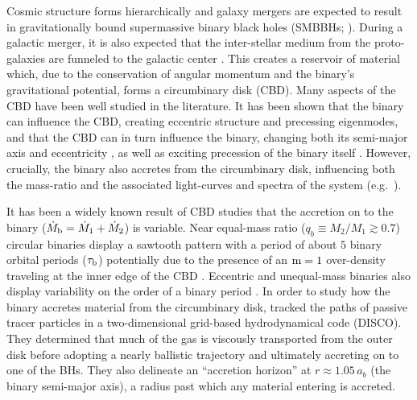 \documentclass[fleqn,usenatbib]{mnras}
\begin{document}
Cosmic structure forms hierarchically and galaxy mergers are expected to result in gravitationally bound supermassive binary black holes (SMBBHs; \citealt{white_rees_78, begelman_blandford_rees_80}). During a galactic merger, it is also expected that the inter-stellar medium from the proto-galaxies are funneled to the galactic center \citep{barnes_hernquist_92}. This creates a reservoir of material which, due to the conservation of angular momentum and the binary's gravitational potential, forms a circumbinary disk (CBD). Many aspects of the CBD have been well studied in the literature. It has been shown that the binary can influence the CBD, creating eccentric structure and precessing eigenmodes, \citep{lubow_91, whitehurst_94, nelson_2003, Goodchild_2006, MacFadyen_08, paardekooper_2008, kley_2008, shi_2012, miranda_munoz_lai_2017, Thun_2017, munoz_lithwick_2020, Lubow_2022, siwek_prefacc} and that the CBD can in turn influence the binary, changing both its semi-major axis and eccentricity \citep{roedig_2011, farris_2014, Moody_19, munoz_miranda_lai_19, Tiede_2020, zrake_2021, dorazio_2013, siwek_cbdorbevol, dorazio_duffel}, as well as exciting precession of the binary itself \citep{tiede_24_diskinducedprecession, dittmann_prec, calcino_prec}. However, crucially, the binary also accretes from the circumbinary disk, influencing both the mass-ratio and the associated light-curves and spectra of the system (e.g.\ \citealt{dorazio_2013, dorazio_charisi, siwek_prefacc, ryan_2022, farris_2014, tiede_dorazio_2025_hotcoldmulticomponentaccretion}).



It has been a widely known result of CBD studies that the accretion on to the binary ($\dot{M}_{\rm{b}} = \dot{M}_1 + \dot{M}_2$) is variable. Near equal-mass ratio ($q_b \equiv M_2/M_1 \gtrsim 0.7$) circular binaries display a sawtooth pattern with a period of about $5$ binary orbital periods ($\tau_{\rm{b}}$) potentially due to the presence of an $\rm{m}=1$ over-density traveling at the inner edge of the CBD \citep{MacFadyen_08, miranda_munoz_lai_2017, munoz_miranda_lai_19, ryan_2022}. Eccentric and unequal-mass binaries also display variability on the order of a binary period \citep{dorazio_2013, farris_2014, miranda_munoz_lai_2017, munoz_miranda_lai_19, duffell_dorazio_2020, ryan_2022}. In order to study how the binary accretes material from the circumbinary disk, \citet{Tiede_22} tracked the paths of passive tracer particles in a two-dimensional grid-based hydrodynamical code (DISCO). They determined that much of the gas is viscously transported from the outer disk before adopting a nearly ballistic trajectory and ultimately accreting on to one of the BHs. They also delineate an ``accretion horizon'' at $r \approx 1.05 \, a_b$ (the binary semi-major axis), a radius past which any material entering is accreted.
\end{document}
